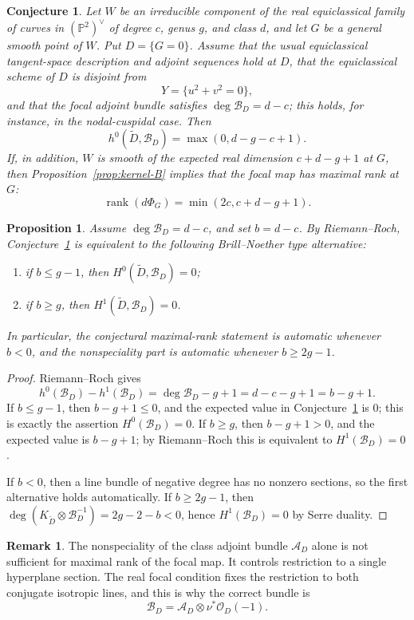 \documentclass[11pt]{amsart}
\newtheorem{prop}[lemma]{Proposition}
\newtheorem{conjecture}[lemma]{Conjecture}
\theoremstyle{definition}
\newtheorem{remark}[lemma]{Remark}
\theoremstyle{remark}
\newcommand{\bP}{\mathbb{P}}
\newcommand{\A}{\mathcal{A}}
\newcommand{\B}{\mathcal{B}}
\begin{document}
\begin{conjecture}\label{conj:main}
Let $W$ be an irreducible component of the real equiclassical family of curves in $(\bP^2)^\vee$ of degree $c$, genus $g$, and class $d$, and let $G$ be a general smooth point of $W$. Put $D=\{G=0\}$. Assume that the usual equiclassical tangent-space description and adjoint sequences hold at $D$, that the equiclassical scheme of $D$ is disjoint from
\[
Y=\{u^2+v^2=0\},
\]
and that the focal adjoint bundle satisfies $\deg \B_D=d-c$; this holds, for instance, in the nodal-cuspidal case. Then
\[
h^0(\widetilde D,\B_D)=\max(0,d-g-c+1).
\]
If, in addition, $W$ is smooth of the expected real dimension $c+d-g+1$ at $G$, then Proposition~\ref{prop:kernel-B} implies that the focal map has maximal rank at $G$:
\[
\operatorname{rank}(d\Phi_G)=\min(2c,c+d-g+1).
\]
\end{conjecture}

\begin{prop}\label{prop:BN-reformulation}
Assume $\deg \B_D=d-c$, and set $b=d-c$. By Riemann--Roch, Conjecture~\ref{conj:main} is equivalent to the following Brill--Noether type alternative:
\begin{enumerate}
\item if $b\le g-1$, then $H^0(\widetilde D,\B_D)=0$;
\item if $b\ge g$, then $H^1(\widetilde D,\B_D)=0$.
\end{enumerate}
In particular, the conjectural maximal-rank statement is automatic whenever $b<0$, and the nonspeciality part is automatic whenever $b\ge 2g-1$.
\end{prop}

\begin{proof}
Riemann--Roch gives
\[
h^0(\B_D)-h^1(\B_D)=\deg \B_D-g+1=d-c-g+1=b-g+1.
\]
If $b\le g-1$, then $b-g+1\le 0$, and the expected value in Conjecture~\ref{conj:main} is $0$; this is exactly the assertion $H^0(\B_D)=0$. If $b\ge g$, then $b-g+1>0$, and the expected value is $b-g+1$; by Riemann--Roch this is equivalent to $H^1(\B_D)=0$.

If $b<0$, then a line bundle of negative degree has no nonzero sections, so the first alternative holds automatically. If $b\ge 2g-1$, then $\deg(K_{\widetilde D}\otimes \B_D^{-1})=2g-2-b<0$, hence $H^1(\B_D)=0$ by Serre duality.
\end{proof}

\begin{remark}\label{rem:old-A-not-enough}
The nonspeciality of the class adjoint bundle $\A_D$ alone is not sufficient for maximal rank of the focal map. It controls restriction to a single hyperplane section. The real focal condition fixes the restriction to both conjugate isotropic lines, and this is why the correct bundle is
\[
\B_D=\A_D\otimes \nu^*\mathcal O_D(-1).
\]
\end{remark}
\end{document}
